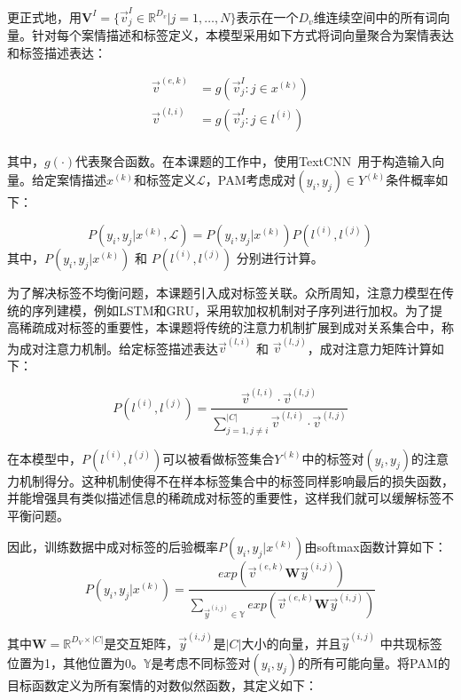 更正式地，用$\textbf{V}^I=\{\vec{v}^I_j\in \mathbb{R}^{D_v}|j=1,\dots,N\}$表示在一个$D_v$维连续空间中的所有词向量。针对每个案情描述和标签定义，本模型采用如下方式将词向量聚合为案情表达和标签描述表达：

$$
\begin{aligned}
\vec{v}^{(e,k)}&=g(\vec{v}^I_j:j\in x^{(k)})\\
\vec{v}^{(l,i)}&=g(\vec{v}^I_j:j\in l^{(i)})\\
\end{aligned}
$$

其中，$g(\cdot)$代表聚合函数。在本课题的工作中，使用TextCNN~\cite{Kim14}用于构造输入向量。给定案情描述$x^{(k)}$和标签定义$\mathcal{L}$，PAM考虑成对$(y_i,y_j)\in Y^{(k)}$条件概率如下：

\begin{displaymath}
P(y_i,y_j|x^{(k)},\mathcal{L})=P(y_i,y_j|x^{(k)})P(l^{(i)},l^{(j)})
\end{displaymath}
其中，$P(y_i,y_j|x^{(k)})$ 和 $P(l^{(i)},l^{(j)})$ 分别进行计算。

为了解决标签不均衡问题，本课题引入成对标签关联。众所周知，注意力模型在传统的序列建模，例如LSTM和GRU，采用软加权机制对子序列进行加权。为了提高稀疏成对标签的重要性，本课题将传统的注意力机制扩展到成对关系集合中，称为成对注意力机制。给定标签描述表达$\vec{v}^{(l,i)}$ 和 $\vec{v}^{(l,j)}$，成对注意力矩阵计算如下：

\begin{equation}\label{eq:similiar}
P(l^{(i)},l^{(j)})=\frac{\vec{v}^{(l,i)}\cdot\vec{v}^{(l,j)}}{\sum_{j=1,j\neq i}^{|C|}\vec{v}^{(l,i)}\cdot\vec{v}^{(l,j)}}
\end{equation}

在本模型中，$P(l^{(i)}, l^{(j)})$可以被看做标签集合$Y^{(k)}$中的标签对$(y_i, y_j)$的注意力机制得分。这种机制使得不在样本标签集合中的标签同样影响最后的损失函数，并能增强具有类似描述信息的稀疏成对标签的重要性，这样我们就可以缓解标签不平衡问题。

因此，训练数据中成对标签的后验概率$P(y_i,y_j|x^{(k)})$由softmax函数计算如下：
\begin{displaymath}
P(y_i,y_j|x^{(k)})=\frac{exp(\vec{v}^{(e,k)}\textbf{W}\vec{y}^{(i,j)})}{\sum_{\vec{y}^{(i,j)}\in\mathbb{Y}}exp(\vec{v}^{(e,k)}\textbf{W}\vec{y}^{(i,j)})}
\end{displaymath}

其中$\textbf{W}=\mathbb{R}^{D_V\times |C|}$是交互矩阵，$\vec{y}^{(i,j)}$是$|C|$大小的向量，并且$\vec{y}^{(i,j)}$ 中共现标签位置为1，其他位置为0。$\mathbb{Y}$是考虑不同标签对$(y_i,y_j)$的所有可能向量。将PAM的目标函数定义为所有案情的对数似然函数，其定义如下：

